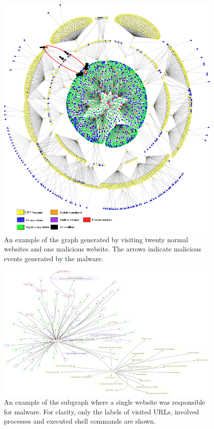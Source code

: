 \begin{figure}[h]
    \centering
    \centerline{\includegraphics[width=20cm]{Images/graph4.jpg}}
    \caption{An example of the graph generated by visiting twenty normal websites and one malicious website. The arrows indicate malicious events generated by the malware.}
    \label{fig:graph}
\end{figure}

\pagebreak

\begin{figure}[h]
    \centering
    \includegraphics[width=25cm, angle=90]{Images/report_Subprocess_from_tab}
    \caption{An example of the subgraph where a single website was responsible for malware. For clarity, only the labels of visited URLs, involved processes and executed shell commands are shown.}
    \label{fig:subgraph}
\end{figure}

